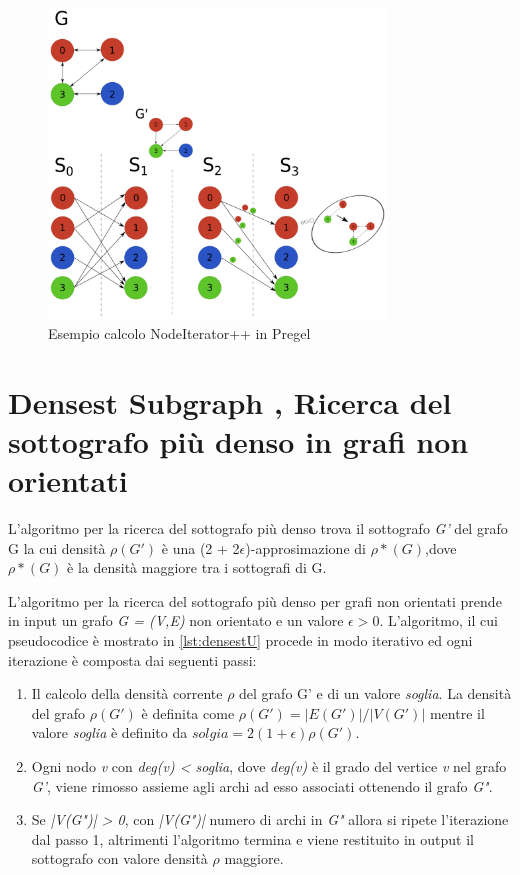 \documentclass[LaM,binding=0.6cm]{sapthesis}
\begin{document}
\begin{figure}
\centering
 \includegraphics[width=0.8\textwidth]{pregel-trianglepp}
\caption{Esempio calcolo NodeIterator++ in Pregel}
\label{fig:PREGELNIT}
\end{figure}

\section{Densest Subgraph , Ricerca del sottografo più denso in grafi non orientati} \label{sssec:densestU}

L'algoritmo per la ricerca del sottografo più denso \cite{Bahmani:2012:DSS:2140436.2140442} trova il sottografo \textit{G'} del grafo G la cui densità $\rho(G')$ è una  (2 + 2$\epsilon$)-approsimazione di $\rho*(G)$,dove $\rho*(G)$ è la densità maggiore tra i sottografi di G.

L'algoritmo per la  ricerca del sottografo più denso per grafi non orientati prende in input un grafo \textit{G = (V,E)} non orientato e un valore \textit{$\epsilon > 0$}.
L'algoritmo, il cui pseudocodice è mostrato in \ref{lst:densestU} procede in modo iterativo ed ogni iterazione è composta dai seguenti passi:
\begin{enumerate}
\item Il calcolo della densità corrente $\rho$ del grafo G' e di un valore \textit{soglia}. La densità del grafo $\rho(G')$ è definita come \textit{$\rho(G') = |E(G')| / |V(G')|$} mentre il  valore \textit{soglia}  è definito da \textit{$solgia = 2 (1 + \epsilon) \rho(G') $}.

\item Ogni nodo \textit{v} con \textit{deg(v) < soglia}, dove \textit{deg(v)} è il grado del vertice \textit{v} nel grafo \textit{G'}, viene rimosso assieme agli archi ad esso associati ottenendo il grafo \textit{G"}.
\item Se \textit{ |V(G")| > 0}, con \textit{|V(G")|} numero di archi in \textit{G"} allora si ripete l'iterazione dal passo 1, altrimenti l'algoritmo termina e viene restituito in output il sottografo con valore densità $\rho$ maggiore.

\end{enumerate}
\end{document}
